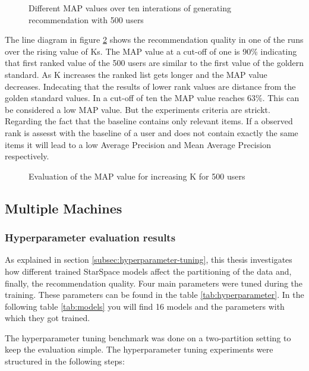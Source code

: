 \begin{figure}[h!]
	\centering
	
	\caption{Different MAP values over ten interations of generating recommendation with 500 users}
	\label{plot:single-partition-boxplot}
\end{figure}


The line diagram in figure \ref{plot:single-partition} shows the recommendation quality in one of the runs over the rising value of Ks. The MAP value at a cut-off of one is 90\% indicating that first ranked value of the 500 users are similar to the first value of the goldern standard. As K increases the ranked list gets longer and the MAP value decreases. Indecating that the results of lower rank values are distance from the golden standard values. In a cut-off of ten the MAP value reaches 63\%. This can be considered a low MAP value. But the experiments criteria are strickt. Regarding the fact that the baseline contains only relevant items. If a observed rank is assesst with the baseline of a user and does not contain exactly the same items it will lead to a low Average Precision and Mean Average Precision respectively.


\begin{figure}[h!]
	\centering
	
	\caption{Evaluation of the MAP value for increasing K for 500 users}
	\label{plot:single-partition}
\end{figure}

\subsection{Multiple Machines}
\label{subsec:eval-multiple-machines}

\subsubsection{Hyperparameter evaluation results}
\label{subsubsec:eval-hyperparameter}
As explained in section \ref{subsec:hyperparameter-tuning}, this thesis investigates how different trained StarSpace models affect the partitioning of the data and, finally, the recommendation quality. Four main parameters were tuned during the training. These parameters can be found in the table \ref{tab:hyperparameter}. In the following table \ref{tab:models} you will find 16 models and the parameters with which they got trained.


The hyperparameter tuning benchmark was done on a two-partition setting to keep the evaluation simple. The hyperparameter tuning experiments were structured in the following steps:

